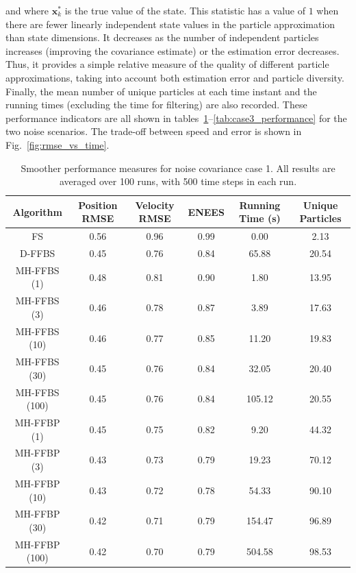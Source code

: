 \documentclass[peerreview,11pt,draftcls,onecolumn]{IEEEtran}
\begin{document}
\noindent and where $\mathbf{x}_k^*$ is the true value of the state. This statistic has a value of $1$ when there are fewer linearly independent state values in the particle approximation than state dimensions. It decreases as the number of independent particles increases (improving the covariance estimate) or the estimation error decreases. Thus, it provides a simple relative measure of the quality of different particle approximations, taking into account both estimation error and particle diversity. Finally, the mean number of unique particles at each time instant and the running times (excluding the time for filtering) are also recorded. These performance indicators are all shown in tables~\ref{tab:case1_performance}--\ref{tab:case3_performance} for the two noise scenarios. The trade-off between speed and error is shown in Fig.~\ref{fig:rmse_vs_time}.

\begin{table}[!t]%
\renewcommand{\arraystretch}{1.3}
\caption{Smoother performance measures for noise covariance case 1. All results are averaged over 100 runs, with 500 time steps in each run.}
\label{tab:case1_performance}
{\scriptsize
\centering
\begin{tabular}{|c||c|c|c|c|c|}
\hline
Algorithm & \begin{minipage}[c]{0.9cm} Position RMSE \end{minipage} & \begin{minipage}[c]{0.9cm}  Velocity RMSE \end{minipage} & \begin{minipage}[c]{0.9cm}  ENEES \end{minipage} & \begin{minipage}[c]{0.9cm}  Running Time (s) \end{minipage} & \begin{minipage}[c]{0.9cm}  Unique Particles \end{minipage} \\
\hline
FS             & 0.56 & 0.96 & 0.99 & 0.00 & 2.13 \\
D-FFBS         & 0.45 & 0.76 & 0.84 & 65.88 & 20.54 \\
\hline
MH-FFBS (1)    & 0.48 & 0.81 & 0.90 & 1.80 & 13.95 \\
MH-FFBS (3)    & 0.46 & 0.78 & 0.87 & 3.89 & 17.63 \\
MH-FFBS (10)   & 0.46 & 0.77 & 0.85 & 11.20 & 19.83 \\
MH-FFBS (30)   & 0.45 & 0.76 & 0.84 & 32.05 & 20.40 \\
MH-FFBS (100)  & 0.45 & 0.76 & 0.84 & 105.12 & 20.55 \\
\hline
MH-FFBP (1)    & 0.45 & 0.75 & 0.82 & 9.20 & 44.32 \\
MH-FFBP (3)    & 0.43 & 0.73 & 0.79 & 19.23 & 70.12 \\
MH-FFBP (10)   & 0.43 & 0.72 & 0.78 & 54.33 & 90.10 \\
MH-FFBP (30)   & 0.42 & 0.71 & 0.79 & 154.47 & 96.89 \\
MH-FFBP (100)  & 0.42 & 0.70 & 0.79 & 504.58 & 98.53 \\
\hline

\end{tabular}
}
\end{table}
\end{document}
